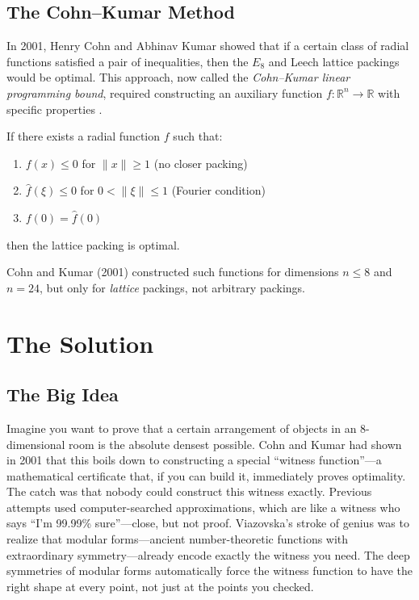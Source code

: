 \subsection{The Cohn--Kumar Method}

In 2001, Henry Cohn and Abhinav Kumar showed that if a certain class of radial functions satisfied a pair of inequalities, then the $E_8$ and Leech lattice packings would be optimal. This approach, now called the \emph{Cohn--Kumar linear programming bound}, required constructing an auxiliary function $f: \mathbb{R}^n \to \mathbb{R}$ with specific properties \cite{cohn2003}.

\begin{theorem}
If there exists a radial function $f$ such that:
\begin{enumerate}
\item $f(x) \leq 0$ for $\|x\| \geq 1$ (no closer packing)
\item $\hat{f}(\xi) \leq 0$ for $0 < \|\xi\| \leq 1$ (Fourier condition)
\item $f(0) = \hat{f}(0)$
\end{enumerate}
then the lattice packing is optimal.
\end{theorem}

Cohn and Kumar (2001) constructed such functions for dimensions $n \leq 8$ and $n = 24$, but only for \emph{lattice} packings, not arbitrary packings.

\section{The Solution}

\subsection{The Big Idea}
Imagine you want to prove that a certain arrangement of objects in an 8-dimensional room is the absolute densest possible. Cohn and Kumar had shown in 2001 that this boils down to constructing a special ``witness function''---a mathematical certificate that, if you can build it, immediately proves optimality. The catch was that nobody could construct this witness exactly. Previous attempts used computer-searched approximations, which are like a witness who says ``I'm 99.99\% sure''---close, but not proof. Viazovska's stroke of genius was to realize that modular forms---ancient number-theoretic functions with extraordinary symmetry---already encode exactly the witness you need. The deep symmetries of modular forms automatically force the witness function to have the right shape at every point, not just at the points you checked.

